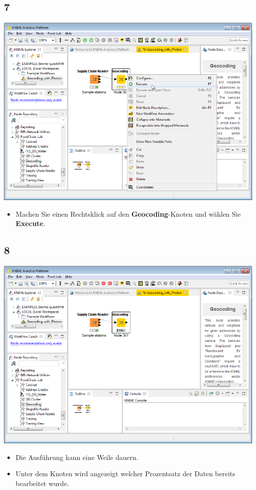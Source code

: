 \documentclass{beamer}
\begin{document}
\subsection{7}
\begin{frame}
	\begin{center}
  		\includegraphics[height=0.6\textheight]{7.png}
	\end{center}
	\begin{itemize}
		\item Machen Sie einen Rechtsklick auf den \textbf{Geocoding}-Knoten und wählen Sie \textbf{Execute}.
	\end{itemize}
\end{frame}

\subsection{8}
\begin{frame}
	\begin{center}
  		\includegraphics[height=0.6\textheight]{8.png}
	\end{center}
	\begin{itemize}
		\item Die Ausführung kann eine Weile dauern.
		\item Unter dem Knoten wird angezeigt welcher Prozentsatz der Daten bereits bearbeitet wurde.
	\end{itemize}
\end{frame}
\end{document}
